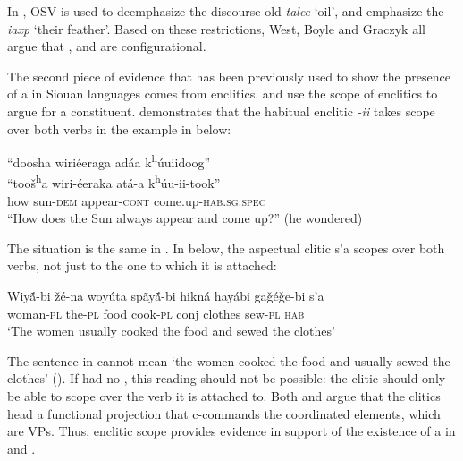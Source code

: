 \documentclass[output=paper]{LSP/langsci}
\begin{document}
In , OSV  is used to deemphasize the discourse-old  \textit{talee} `oil', and emphasize the  \textit{iaxp} `their feather'.  Based on these  restrictions, West, Boyle and Graczyk all argue that ,  and  are configurational. 
	
The second piece of evidence that has been previously used to show the presence of a  in Siouan languages comes from enclitics. \citet{West2003} and \citet{Boyle2007} use the scope of enclitics to argue for a  constituent. \citet{Boyle2007} demonstrates that the  habitual enclitic \textit{-ii} takes scope over both verbs in the example in  below:

\begin{exe}
\ex\label{ex:jrs:27} 
\glll ``doosha	wiri\'eeraga 	ad\'aa 	 k\textsuperscript{h}\'uuiidoog''\\
``too\v{s}\textsuperscript{h}a 	wiri-\'eeraka 	at\'a-a k\textsuperscript{h}\'uu-ii-took'' \\
how 	sun-\textsc{dem} 	appear-\textsc{cont}  come.up-\textsc{hab.sg.spec} \\
\trans ``How does the Sun always appear and come up?'' (he wondered) \citep[223]{Boyle2007}
\end{exe}

The situation is the same in .  In  below, the aspectual clitic s'a scopes over both verbs, not just to the one to which it is attached:

\begin{exe}
\ex\label{ex:jrs:28} \gll Wiy\'{\~a}-bi 		\v{z}\'e-na 	woy\'uta 	sp\~ay\'{\~a}-bi 	hikn\'a 	hay\'abi 		ga\v{g}\'e\v{g}e-bi 	s'a \\
woman-\textsc{pl} the-\textsc{pl} 	food 	cook-\textsc{pl} 	conj 	clothes 	sew-\textsc{pl} 	\textsc{hab} \\
\trans `The women usually cooked the food and sewed the clothes' \citep[39]{West2003}
\end{exe}

The sentence in  cannot mean `the women cooked the food and usually sewed the clothes' (\citealt{West2003}).  If  had no , this reading should not be possible: the clitic should only be able to scope over the verb it is attached to. Both \citet{Boyle2007} and \citet{West2003} argue that the clitics head a functional projection that c-commands the coordinated elements, which are VPs.  Thus, enclitic scope provides evidence in support of the existence of a  in  and .
	
\end{document}
